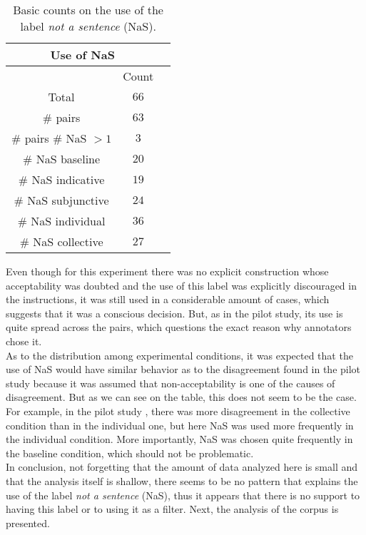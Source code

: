 \begin{table}
\center
\begin{tabular}{|c|c|c|}
\hline
\multicolumn{2}{|c|}{Use of NaS}\\\hline
                      & Count\\\hline 
Total & $66$\\\hline 
\# pairs & $63$ \\\hline
\# pairs \# NaS $>1$ & $3$\\\hline
\# NaS baseline & $20$\\\hline
\# NaS indicative & $19$\\\hline
\# NaS subjunctive & $24$\\\hline
\# NaS individual & $36$\\\hline
\# NaS collective& $27$\\\hline
\end{tabular}
\caption[Use of NaS]{Basic counts on the use of the label \textit{not a sentence} (NaS).}
\label{tab:nas}
\end{table}

Even though for this experiment there was no explicit construction whose acceptability was doubted and the use of this label was explicitly discouraged in the instructions, it was still used in a considerable amount of cases, which suggests that it was a conscious decision. But, as in the pilot study, its use is quite spread across the pairs, which questions the exact reason why annotators chose it.\\

As to the distribution among experimental conditions, it was expected that the use of NaS would have similar behavior as to the disagreement found in the pilot study because it was assumed that non-acceptability is one of the causes of disagreement. But as we can see on the table, this does not seem to be the case. For example, in the pilot study , there was more disagreement in the collective condition than in the individual one, but here NaS was used more frequently in the individual condition. More importantly, NaS was chosen quite frequently in the baseline condition, which should not be problematic.\\

In conclusion, not forgetting that the amount of data analyzed here is small and that the analysis itself is shallow, there seems to be no pattern that explains the use of the label \textit{not a sentence} (NaS), thus it appears that there is no support to having this label or to using it as a filter. Next, the analysis of the corpus is presented.\\ 

